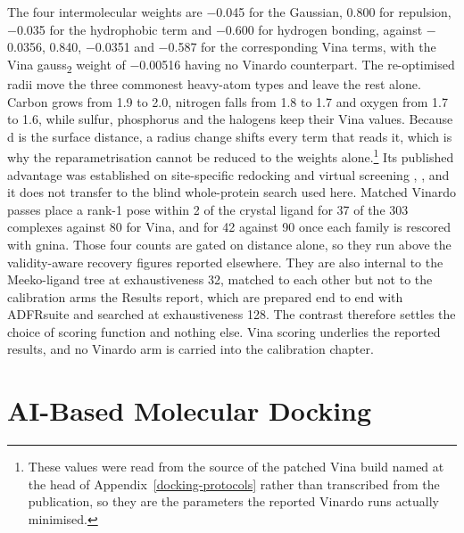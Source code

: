 The four intermolecular weights are \ensuremath{-}0.045 for the Gaussian, 0.800 for repulsion, \ensuremath{-}0.035 for the hydrophobic term and \ensuremath{-}0.600 for hydrogen bonding, against \ensuremath{-}0.0356, 0.840, \ensuremath{-}0.0351 and \ensuremath{-}0.587 for the corresponding Vina terms, with the Vina gauss\textsubscript{2} weight of \ensuremath{-}0.00516 having no Vinardo counterpart. The re-optimised radii move the three commonest heavy-atom types and leave the rest alone. Carbon grows from 1.9 to 2.0\angstrom{}, nitrogen falls from 1.8 to 1.7\angstrom{} and oxygen from 1.7 to 1.6\angstrom{}, while sulfur, phosphorus and the halogens keep their Vina values. Because d is the surface distance, a radius change shifts every term that reads it, which is why the reparametrisation cannot be reduced to the weights alone.\footnote{These values were read from the source of the patched Vina build named at the head of Appendix~\ref{docking-protocols} rather than transcribed from the publication, so they are the parameters the reported Vinardo runs actually minimised.} Its published advantage was established on site-specific redocking and virtual screening \cite{ref073}, \cite{ref083}, and it does not transfer to the blind whole-protein search used here. Matched Vinardo passes place a rank-1 pose within 2\angstrom{} of the crystal ligand for 37 of the 303 complexes against 80 for Vina, and for 42 against 90 once each family is rescored with gnina. Those four counts are gated on distance alone, so they run above the validity-aware recovery figures reported elsewhere. They are also internal to the Meeko-ligand tree at exhaustiveness 32, matched to each other but not to the calibration arms the Results report, which are prepared end to end with ADFRsuite and searched at exhaustiveness 128. The contrast therefore settles the choice of scoring function and nothing else. Vina scoring underlies the reported results, and no Vinardo arm is carried into the calibration chapter.

\hypertarget{ai-based-molecular-docking-1}{%
\section{AI-Based Molecular Docking}\label{ai-based-molecular-docking-1}}

